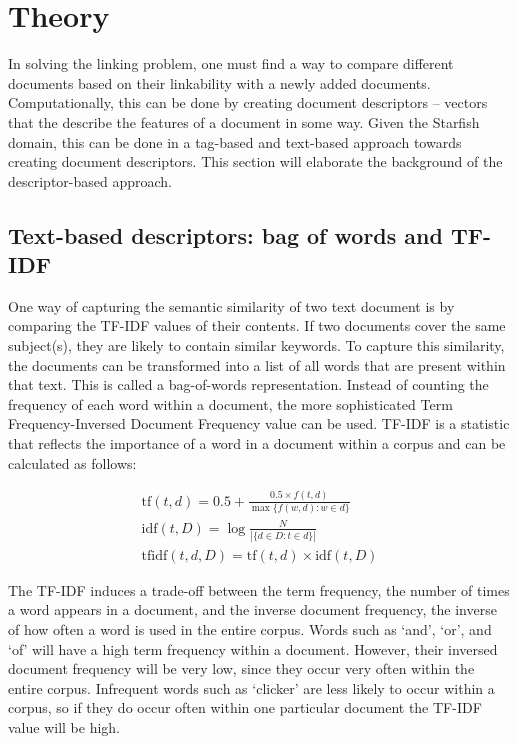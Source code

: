 \section{Theory}

In solving the linking problem, one must find a way to compare different
documents based on their linkability with a newly added documents.
Computationally, this can be done by creating document descriptors -- vectors
that the describe the features of a document in some way. Given the Starfish
domain, this can be done in a tag-based and text-based approach towards
creating document descriptors. This section will elaborate the background of
the descriptor-based approach. 

\subsection{Text-based descriptors: bag of words and TF-IDF}
One way of capturing the semantic similarity of two text document is by
comparing the TF-IDF values of their contents. If two documents cover the same
subject(s), they are likely to contain similar keywords. To capture this
similarity, the documents can be transformed into a list of all words that are
present within that text. This is called a bag-of-words representation. Instead
of counting the frequency of each word within a document, the more
sophisticated Term Frequency-Inversed Document Frequency value can be used.
TF-IDF is a statistic that reflects the importance of a word in a document
within a corpus and can be calculated as follows:

\begin{align}
\textrm{tf}(t,d) = 0.5 + \frac{0.5 \times {f}(t, d)}{\max\{{f}(w, d):w \in d\}}\\
\textrm{idf}(t, D) =  \log \frac{N}{|\{d \in D: t \in d\}|}\\
\textrm{tfidf}(t,d,D) = \textrm{tf}(t,d) \times \textrm{idf}(t, D)
\end{align}

The TF-IDF induces a trade-off between the term frequency, the number of times
a word appears in a document, and the inverse document frequency, the inverse
of how often a word is used in the entire corpus. Words such as `and', `or',
and `of' will have a high term frequency within a document. However, their
inversed document frequency will be very low, since they occur very often
within the entire corpus. Infrequent words such as `clicker' are less likely to
occur within a corpus, so if they do occur often within one particular document
the TF-IDF value will be high. 

